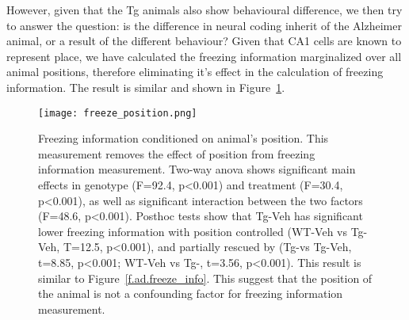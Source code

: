However, given that the Tg animals also show behavioural difference, we then try to answer the question: is the difference in neural coding inherit of the Alzheimer animal, or a result of the different behaviour? Given that CA1 cells are known to represent place, we have calculated the freezing information marginalized over all animal positions, therefore eliminating it's effect in the calculation of freezing information. The result is similar and shown in Figure~\ref{f.ad.freeze_ctrl}.  
\begin{figure}[h]
    \texttt{[image: freeze\_position.png]}
    \caption{Freezing information conditioned on animal's position. This measurement removes the effect of position from freezing information measurement. Two-way \gls{anova} shows significant main effects in genotype (F=92.4, p<0.001) and treatment (F=30.4, p<0.001), as well as significant interaction between the two factors (F=48.6, p<0.001). Posthoc tests show that Tg-Veh has significant lower freezing information with position controlled (WT-Veh vs Tg-Veh, T=12.5, p<0.001), and partially rescued by \tglu (Tg-\tglu vs Tg-Veh, t=8.85, p<0.001; WT-Veh vs Tg-\tglu, t=3.56, p<0.001). This result is similar to Figure~\ref{f.ad.freeze_info}. This suggest that the position of the animal is not a confounding factor for freezing information measurement. \label{f.ad.freeze_ctrl}}
\end{figure}


